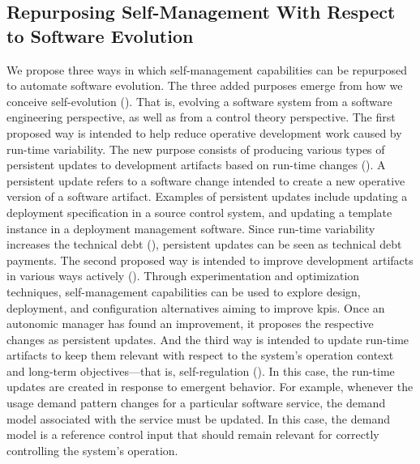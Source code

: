 \subsection{Repurposing Self-Management With Respect to Software Evolution}
\label{subsect:overview--self-management}

We propose three ways in which self-management capabilities can be repurposed to automate software evolution. The three added purposes emerge from how we conceive self-evolution (). That is, evolving a software system from a software engineering perspective, as well as from a control theory perspective. The first proposed way is intended to help reduce operative development work caused by run-time variability. The new purpose consists of producing various types of persistent updates to development artifacts based on run-time changes (). A persistent update refers to a software change intended to create a new operative version of a software artifact. Examples of persistent updates include updating a deployment specification in a source control system, and updating a template instance in a deployment management software. 
Since run-time variability increases the technical debt (), persistent updates can be seen as technical debt payments. 
The second proposed way is intended to improve development artifacts in various ways actively (). Through experimentation and optimization techniques, self-management capabilities can be used to explore design, deployment, and configuration alternatives aiming to improve \glspl{kpi}. Once an autonomic manager has found an improvement, it proposes the respective changes as persistent updates. And the third way is intended to update run-time artifacts to keep them relevant with respect to the system's operation context and long-term objectives---that is, self-regulation (). In this case, the run-time updates are created in response to emergent behavior. For example, whenever the usage demand pattern changes for a particular software service, the demand model associated with the service must be updated. In this case, the demand model is a reference control input that should remain relevant for correctly controlling the system's operation.

